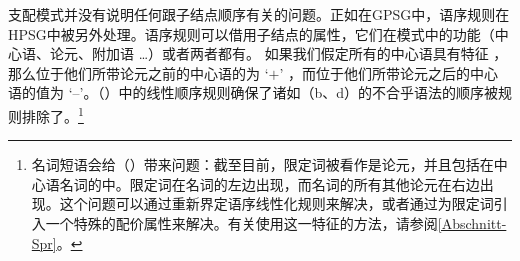 支配模式并没有说明任何跟子结点顺序有关的问题\indexgpsgc。正如在GPSG中，语序规则在HPSG中被另外处理。语序规则可以借用子结点的属性，它们在模式中的功能（中心语、论元、附加语 \ldots）或者两者都有。
如果我们假定所有的中心语具有特征\initial{} ，那么位于他们所带论元之前的中心语的\initialvc 为 `$+$' ，而位于他们所带论元之后的中心语的值为 `--'。（）中的线性顺序规则确保了诸如（b、d）的不合乎语法的顺序被规则排除了。\footnote{%
  名词短语会给（）带来问题：截至目前，限定词被看作是论元，并且包括在中心语名词的\subcatlc 中。限定词在名词的左边出现，而名词的所有其他论元在右边出现。这个问题可以通过重新界定语序线性化规则\citep[--165]{Mueller99a}来解决，或者通过为限定词引入一个特殊的配价属性来解决\citep[\S~9.4]{ps2}。有关使用这一特征的方法，请参阅\ref{Abschnitt-Spr}。
}

